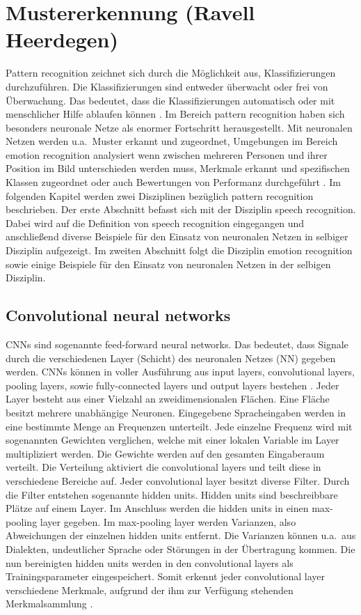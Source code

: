 \section{Mustererkennung (Ravell Heerdegen)} \label{Mustererkennung}
Pattern recognition zeichnet sich durch die Möglichkeit aus, Klassifizierungen durchzuführen. Die Klassifizierungen sind entweder überwacht oder frei von Überwachung. Das bedeutet, dass die Klassifizierungen automatisch oder mit menschlicher Hilfe ablaufen können \cite{svmgmm}. Im Bereich pattern recognition haben sich besonders neuronale Netze als enormer Fortschritt herausgestellt. Mit neuronalen Netzen werden u.a.~Muster erkannt und zugeordnet, Umgebungen im Bereich emotion recognition analysiert wenn zwischen mehreren Personen und ihrer Position im Bild unterschieden werden muss, Merkmale erkannt und spezifischen Klassen zugeordnet oder auch Bewertungen von Performanz durchgeführt \cite{patternrec}.
Im folgenden Kapitel werden zwei Disziplinen bezüglich pattern recognition beschrieben. Der erste Abschnitt befasst sich mit der Disziplin speech recognition. Dabei wird auf die Definition von speech recognition eingegangen und anschließend diverse Beispiele für den Einsatz von neuronalen Netzen in selbiger Disziplin aufgezeigt.
Im zweiten Abschnitt folgt die Disziplin emotion recognition sowie einige Beispiele für den Einsatz von neuronalen Netzen in der selbigen Disziplin.

\subsection{Convolutional neural networks}
CNNs sind sogenannte feed-forward neural networks. Das bedeutet, dass Signale durch die verschiedenen Layer (Schicht) des neuronalen Netzes (NN) gegeben werden. CNNs können in voller Ausführung aus input layers, convolutional layers, pooling layers, sowie fully-connected layers und output layers bestehen \cite{facialemotionrecusingcnn}. Jeder Layer besteht aus einer Vielzahl an zweidimensionalen Flächen. Eine Fläche besitzt mehrere unabhängige Neuronen. Eingegebene Spracheingaben werden in eine bestimmte Menge an Frequenzen unterteilt. Jede einzelne Frequenz wird mit sogenannten Gewichten verglichen, welche mit einer lokalen Variable im Layer multipliziert werden. Die Gewichte werden auf den gesamten Eingaberaum verteilt. Die Verteilung aktiviert die convolutional layers und teilt diese in verschiedene Bereiche auf. Jeder convolutional layer besitzt diverse Filter. Durch die Filter entstehen sogenannte hidden units. Hidden units sind beschreibbare Plätze auf einem Layer. Im Anschluss werden die hidden units in einen max-pooling layer gegeben. Im max-pooling layer werden Varianzen, also Abweichungen der einzelnen hidden units entfernt. Die Varianzen können u.a.~aus Dialekten, undeutlicher Sprache oder Störungen in der Übertragung kommen. Die nun bereinigten hidden units werden in den convolutional layers als Trainingsparameter eingespeichert. Somit erkennt jeder convolutional layer verschiedene Merkmale, aufgrund der ihm zur Verfügung stehenden Merkmalsammlung \cite{usingcnn}.

\vspace{3.0cm}
